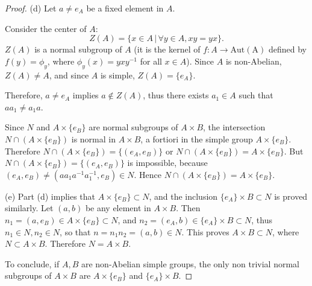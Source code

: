 \documentclass[11pt,a4paper]{article}
\begin{document}
\begin{proof}
\item[(d)] Let $a\ne e_A$ be a fixed element in $A$.

Consider the center of $A$:
$$Z(A) = \{x \in A\, | \, \forall y \in A, xy = yx\}.$$
$Z(A)$ is a normal subgroup of $A$ (it is the kernel of $f : A \to \mathrm{Aut(A)}$ defined by $f(y) =\phi_y$, where $\phi_y(x) = yxy^{-1}$ for all $x\in A$). Since $A$ is non-Abelian, $Z(A) \ne A$, and since $A$ is simple, $Z(A) = \{e_A\}$.

Therefore, $a\ne e_A$ implies $a \not \in Z(A)$, thus there exists $a_1 \in A$ such that $aa_1 \ne a_1 a$.

Since $N$ and $A\times \{e_B\}$ are normal subgroups of $A\times B$, the intersection $N \cap (A\times \{e_B\})$ is normal in $A\times B$, a fortiori in the simple group $A\times \{e_B\}$. Therefore  $N \cap (A\times \{e_B\}) =\{(e_A,e_B)\}$ or $N \cap (A\times \{e_B\}) = A \times \{e_B\}$. But $N \cap (A\times \{e_B\}) =\{(e_A,e_B)\}$ is impossible, because $(e_A,e_B) \ne (aa_1a^{-1}a_1^{-1}, e_B) \in N$. Hence $N \cap (A\times \{e_B\}) = A \times \{e_B\}$.

\item[(e)] Part (d) implies that $A \times \{e_B\} \subset N$, and the inclusion $\{e_A\} \times B \subset N$ is proved similarly. Let $(a,b)$ be any element in $A\times B$. Then 
$n_1 = (a,e_B) \in A\times\{e_B\} \subset N$, and $n_2 = (e_A,b) \in \{e_A\} \times B \subset N$, thus $n_1 \in N, n_2 \in N$, so that $n =n_1n_2 = (a,b) \in N$. This proves $A\times B \subset N$, where $N \subset A\times B$. Therefore $N = A \times B$.

To conclude, if $A,B$ are non-Abelian simple groups, the only non trivial normal subgroups of $A\times B$ are $A \times \{e_B\}$ and $\{e_A\} \times B$.
\end{proof}
\end{document}
